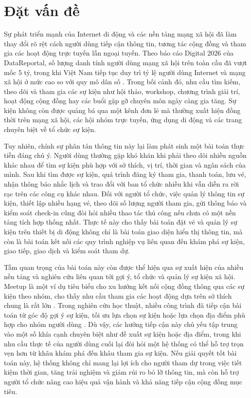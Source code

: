 \documentclass[../DoAn.tex]{subfiles}
\begin{document}
\section{Đặt vấn đề}
\label{section:1.1}
Sự phát triển mạnh của Internet di động và các nền tảng mạng xã hội đã làm thay đổi rõ rệt cách người dùng tiếp cận thông tin, tương tác cộng đồng và tham gia các hoạt động trực tuyến lẫn ngoại tuyến. Theo báo cáo Digital 2026 của DataReportal, số lượng danh tính người dùng mạng xã hội trên toàn cầu đã vượt mốc 5 tỷ, trong khi Việt Nam tiếp tục duy trì tỷ lệ người dùng Internet và mạng xã hội ở mức cao so với quy mô dân số \cite{kemp2025digitalglobal2026,kemp2025digitalvietnam2026}. Trong bối cảnh đó, nhu cầu tìm kiếm, theo dõi và tham gia các sự kiện như hội thảo, workshop, chương trình giải trí, hoạt động cộng đồng hay các buổi gặp gỡ chuyên môn ngày càng gia tăng. Sự kiện không còn được quảng bá qua một kênh đơn lẻ mà thường xuất hiện đồng thời trên mạng xã hội, các hội nhóm trực tuyến, ứng dụng di động và các trang chuyên biệt về tổ chức sự kiện.

Tuy nhiên, chính sự phân tán thông tin này lại làm phát sinh một bài toán thực tiễn đáng chú ý. Người dùng thường gặp khó khăn khi phải theo dõi nhiều nguồn khác nhau để tìm sự kiện phù hợp với sở thích, vị trí, thời gian và ngân sách của mình. Sau khi tìm được sự kiện, quá trình đăng ký tham gia, thanh toán, lưu vé, nhận thông báo nhắc lịch và trao đổi với ban tổ chức nhiều khi vẫn diễn ra rời rạc trên các công cụ khác nhau. Đối với người tổ chức, việc quản lý thông tin sự kiện, thiết lập nhiều hạng vé, theo dõi số lượng người tham gia, gửi thông báo và kiểm soát check-in cũng đòi hỏi nhiều thao tác thủ công nếu chưa có một nền tảng tích hợp thống nhất. Thực tế này cho thấy bài toán đặt vé và quản lý sự kiện trên thiết bị di động không chỉ là bài toán giao diện hiển thị thông tin, mà còn là bài toán kết nối các quy trình nghiệp vụ liên quan đến khám phá sự kiện, giao tiếp, giao dịch và kiểm soát tham dự.

Tầm quan trọng của bài toán này còn được thể hiện qua sự xuất hiện của nhiều nền tảng và nghiên cứu liên quan tới gợi ý, tổ chức và quản lý sự kiện xã hội. Meetup là một ví dụ tiêu biểu cho xu hướng kết nối cộng đồng thông qua các sự kiện theo nhóm, cho thấy nhu cầu tham gia các hoạt động dựa trên sở thích chung là rất lớn \cite{meetup2026about}. Trong nghiên cứu học thuật, nhiều công trình đã tiếp cận bài toán từ góc độ gợi ý sự kiện, tối ưu lựa chọn sự kiện hoặc lựa chọn địa điểm phù hợp cho nhóm người dùng \cite{cena2014event,liao2020acger,zhang2019gevr}. Dù vậy, các hướng tiếp cận này chủ yếu tập trung vào một số khía cạnh chuyên biệt như đề xuất sự kiện hoặc địa điểm, trong khi nhu cầu thực tế của người dùng cuối lại đòi hỏi một hệ thống có thể hỗ trợ trọn vẹn hơn từ khâu khám phá đến khâu tham gia sự kiện. Nếu giải quyết tốt bài toán này, hệ thống không chỉ mang lại lợi ích cho người tham dự trong việc tiết kiệm thời gian, tăng trải nghiệm và giảm rủi ro bỏ lỡ thông tin, mà còn hỗ trợ người tổ chức nâng cao hiệu quả vận hành và khả năng tiếp cận cộng đồng mục tiêu.
\end{document}
